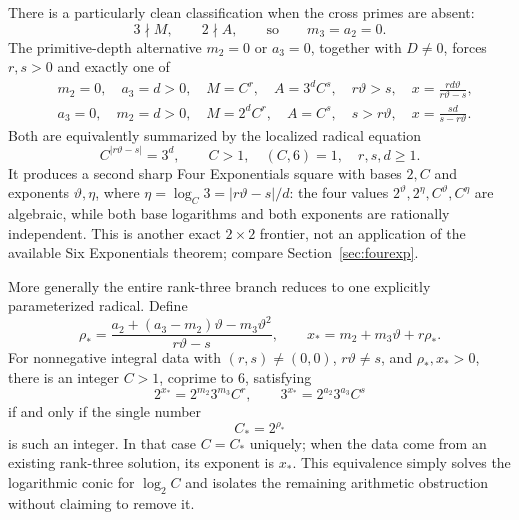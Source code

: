 \documentclass[11pt,oneside]{article}
\theoremstyle{definition}
\theoremstyle{remark}
\newcommand{\thetaq}{\vartheta}
\begin{document}
There is a particularly clean classification when the cross primes are absent:
\begin{equation}
 3\nmid M,\qquad 2\nmid A,\qquad\text{so}\qquad m_3=a_2=0.
 \label{rankgeom:eq-no-cross-primes}
\end{equation}
The primitive-depth alternative $m_2=0$ or $a_3=0$, together with $D\ne0$, forces
$r,s>0$ and exactly one of
\begin{align}
 &m_2=0,\quad a_3=d>0,\quad
 M=C^r,\quad A=3^dC^s,\quad r\thetaq>s,\quad
 x=\frac{rd\thetaq}{r\thetaq-s},
 \label{rankgeom:eq-no-cross-plus}\\
 &a_3=0,\quad m_2=d>0,\quad
 M=2^dC^r,\quad A=C^s,\quad s>r\thetaq,\quad
 x=\frac{sd}{s-r\thetaq}.
 \label{rankgeom:eq-no-cross-minus}
\end{align}
Both are equivalently summarized by the localized radical equation
\begin{equation}
 \boxed{C^{|r\thetaq-s|}=3^d},\qquad C>1,\quad(C,6)=1,\quad r,s,d\ge1.
 \label{rankgeom:eq-localized-radical}
\end{equation}
It produces a second sharp Four Exponentials square with bases $2,C$ and exponents
$\thetaq,\eta$, where
$\eta=\log_C 3=|r\thetaq-s|/d$: the four values
$2^{\thetaq},2^\eta,C^{\thetaq},C^\eta$ are algebraic, while both base logarithms and both
exponents are rationally independent.  This is another exact $2\times2$ frontier, not an
application of the available Six Exponentials theorem; compare
Section~\ref{sec:fourexp}.

More generally the entire rank-three branch reduces to one explicitly parameterized radical.
Define
\begin{equation}
 \rho_*=
 \frac{a_2+(a_3-m_2)\thetaq-m_3\thetaq^2}{r\thetaq-s},
 \qquad
 x_*=m_2+m_3\thetaq+r\rho_*.
 \label{rankgeom:eq-special-radical-parameters}
\end{equation}
For nonnegative integral data with $(r,s)\ne(0,0)$, $r\thetaq\ne s$, and
$\rho_*,x_*>0$, there is an integer $C>1$, coprime to $6$, satisfying
\[
 2^{x_*}=2^{m_2}3^{m_3}C^r,\qquad
 3^{x_*}=2^{a_2}3^{a_3}C^s
\]
if and only if the single number
\begin{equation}
 \boxed{C_*=2^{\rho_*}}
 \label{rankgeom:eq-one-special-radical}
\end{equation}
is such an integer.  In that case $C=C_*$ uniquely; when the data come from an existing
rank-three solution, its exponent is $x_*$.  This equivalence simply solves the logarithmic
conic for $\log_2C$ and isolates the remaining arithmetic obstruction without claiming to
remove it.
\end{document}
